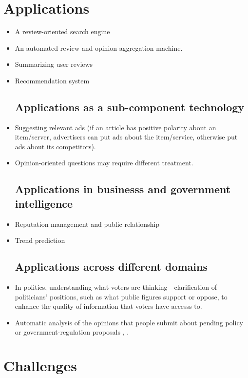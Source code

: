 \documentclass{article}
\begin{document}
\chapter{Applications}
  \begin{itemize}
    \section{Applications to review-related websites}
      \item A review-oriented search engine
      \item An automated review and opinion-aggregation machine.
      \item Summarizing user reviews
      \item Recommendation system
    \section{Applications as a sub-component technology}
      \item Suggesting relevant ads (if an article has positive polarity about
an  item/server, advertisers can put ads about the item/service, otherwise put
ads  about its competitors).
      \item Opinion-oriented questions may require different treatment.
    \section{Applications in businesss and government intelligence}
      \item Reputation management and public relationship
      \item Trend prediction
    \section{Applications across different domains}
      \item In politics, understanding what voters are thinking - clarification
of politicians' positions, such as what public figures support or oppose, to
enhance the quality of information that voters have accesss to.      
      \item Automatic analysis of the opinions that people submit about pending
policy or government-regulation proposals \citet{Cynthia2006}, \citet{Kwon2006}.
  \end{itemize}

\chapter{Challenges}
\end{document}
